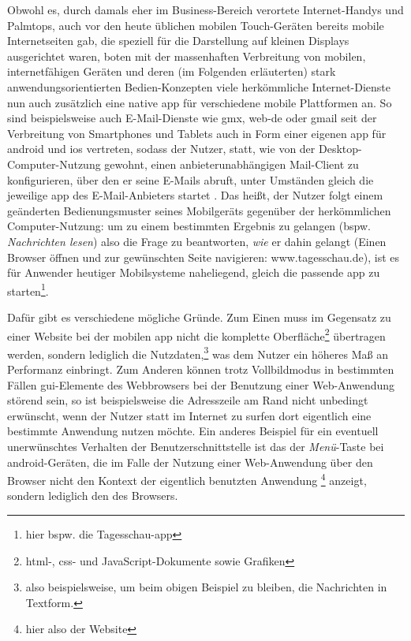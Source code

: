 Obwohl es, durch damals eher im Business-Bereich verortete Internet-Handys und Palmtops, auch vor den heute üblichen mobilen Touch-Geräten bereits mobile Internetseiten gab, die speziell für die Darstellung auf kleinen Displays ausgerichtet waren, boten mit der massenhaften Verbreitung von mobilen, internetfähigen Geräten und deren (im Folgenden erläuterten) stark anwendungsorientierten Bedien-Konzepten viele herkömmliche Internet-Dienste nun auch zusätzlich eine native \gls{app} für verschiedene mobile Plattformen an.
So sind beispielsweise auch E-Mail-Dienste wie \gls{gmx}, \gls{web-de} oder \gls{gmail} seit der Verbreitung von Smartphones und Tablets auch in Form einer eigenen \gls{app} für \gls{android} und \gls{ios} vertreten, sodass der Nutzer, statt, wie von der Desktop-Computer-Nutzung gewohnt, einen anbieterunabhängigen Mail-Client zu konfigurieren, über den er seine E-Mails abruft, unter Umständen gleich die jeweilige \gls{app} des E-Mail-Anbieters startet \cite{gmx, web.de, gmail}.
Das heißt, der Nutzer folgt einem geänderten Bedienungsmuster seines Mobilgeräts gegenüber der herkömmlichen Computer-Nutzung: um zu einem bestimmten Ergebnis zu gelangen (bspw. \emph{Nachrichten lesen}) also die Frage zu beantworten, \emph{wie} er dahin gelangt (Einen Browser öffnen und zur gewünschten Seite navigieren: www.tagesschau.de), ist es für Anwender heutiger Mobilsysteme naheliegend, gleich die passende \gls{app} zu starten\footnote{hier bspw. die Tagesschau-\gls{app}}.

Dafür gibt es verschiedene mögliche Gründe. Zum Einen muss im Gegensatz zu einer Website bei der mobilen \gls{app} nicht die komplette Oberfläche\footnote{\gls{html}-, \gls{css}- und JavaScript-Dokumente sowie Grafiken} übertragen werden, sondern lediglich die Nutzdaten,\footnote{also beispielsweise, um beim obigen Beispiel zu bleiben, die Nachrichten in Textform.} was dem Nutzer ein höheres Maß an Performanz einbringt.
Zum Anderen können trotz Vollbildmodus in bestimmten Fällen \gls{gui}-Elemente des Webbrowsers bei der Benutzung einer Web-Anwendung störend sein, so ist beispielsweise die Adresszeile am Rand nicht unbedingt erwünscht, wenn der Nutzer statt im Internet zu surfen dort eigentlich eine bestimmte Anwendung nutzen möchte. 
Ein anderes Beispiel für ein eventuell unerwünschtes Verhalten der Benutzerschnittstelle ist das der \emph{Menü}-Taste bei \gls{android}-Geräten, die im Falle der Nutzung einer Web-Anwendung über den Browser nicht den Kontext der eigentlich benutzten Anwendung \footnote{hier also der Website} anzeigt, sondern lediglich den des Browsers.

